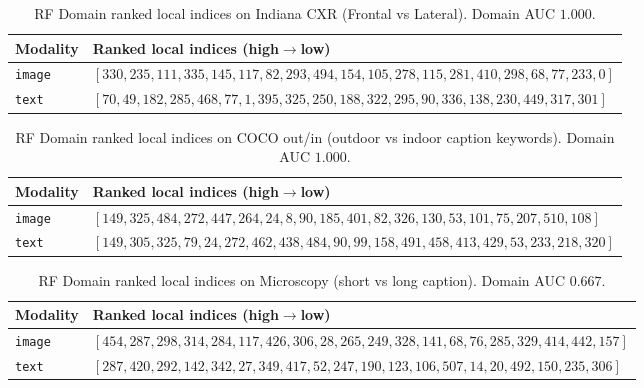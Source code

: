 \begin{table}[ht]
\centering
\caption{RF Domain ranked local indices on Indiana CXR (Frontal vs Lateral). Domain AUC $1.000$.}
\label{tab:mm-fsds-indiana_cxr-rf}
\small
\begin{tabular}{@{}l p{11.2cm}@{}}
\toprule
Modality & Ranked local indices (high$\to$low) \\
\midrule
\texttt{image} & $[330,235,111,335,145,117,82,293,494,154,105,278,115,281,410,298,68,77,233,0]$ \\
\texttt{text} & $[70,49,182,285,468,77,1,395,325,250,188,322,295,90,336,138,230,449,317,301]$ \\
\bottomrule
\end{tabular}
\end{table}

\begin{table}[ht]
\centering
\caption{RF Domain ranked local indices on COCO out/in (outdoor vs indoor caption keywords). Domain AUC $1.000$.}
\label{tab:mm-fsds-coco_outdoor_indoor-rf}
\small
\begin{tabular}{@{}l p{11.2cm}@{}}
\toprule
Modality & Ranked local indices (high$\to$low) \\
\midrule
\texttt{image} & $[149,325,484,272,447,264,24,8,90,185,401,82,326,130,53,101,75,207,510,108]$ \\
\texttt{text} & $[149,305,325,79,24,272,462,438,484,90,99,158,491,458,413,429,53,233,218,320]$ \\
\bottomrule
\end{tabular}
\end{table}

\begin{table}[ht]
\centering
\caption{RF Domain ranked local indices on Microscopy (short vs long caption). Domain AUC $0.667$.}
\label{tab:mm-fsds-microscopy_clip-rf}
\small
\begin{tabular}{@{}l p{11.2cm}@{}}
\toprule
Modality & Ranked local indices (high$\to$low) \\
\midrule
\texttt{image} & $[454,287,298,314,284,117,426,306,28,265,249,328,141,68,76,285,329,414,442,157]$ \\
\texttt{text} & $[287,420,292,142,342,27,349,417,52,247,190,123,106,507,14,20,492,150,235,306]$ \\
\bottomrule
\end{tabular}
\end{table}

